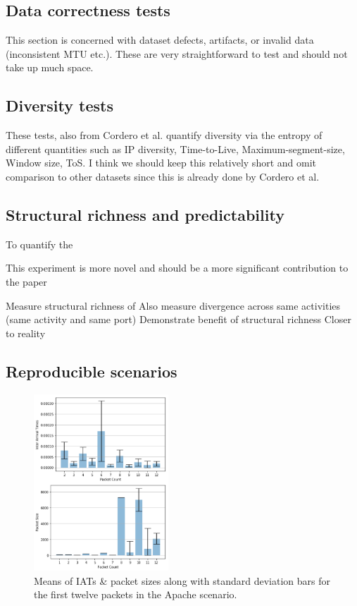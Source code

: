 \documentclass[sigconf]{acmart}
\begin{document}
\subsection{Data correctness tests}

This section is concerned with dataset defects, artifacts, or invalid data (inconsistent MTU etc.). These are very straightforward to test and should not take up much space. 


\subsection{Diversity tests}

These tests, also from Cordero et al. quantify diversity via the entropy of different quantities such as IP diversity, Time-to-Live, Maximum-segment-size, Window size, ToS. I think we should keep this relatively short and omit comparison to other datasets since this is already done by Cordero et al. 

\subsection{Structural richness and predictability}

To quantify the 

This experiment is more novel and should be a more significant contribution to the paper


Measure structural richness of
Also measure divergence across same activities (same activity and same port)
Demonstrate benefit of structural richness
Closer to reality



\subsection{Reproducible scenarios}\label{Sec:deterministic}


\begin{figure}
\includegraphics[width=0.45\textwidth]{images/combined3.png} %
\caption{Means of IATs \& packet sizes along with standard deviation bars for the first twelve packets in the Apache scenario.}
\label{fig:size1}
\end{figure}
\end{document}
